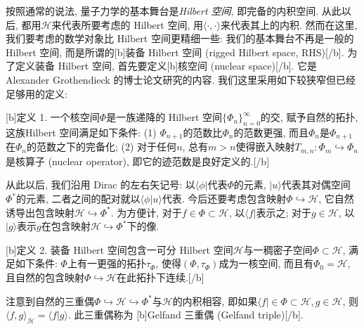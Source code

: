 
      按照通常的说法, 量子力学的基本舞台是\emph{Hilbert 空间}, 即完备的内积空间. 从此以后, 都用$\mathcal{H}$来代表所要考虑的 Hilbert 空间, 用$\langle\cdot,\cdot\rangle$来代表其上的内积. 然而在这里, 我们要考虑的数学对象比 Hilbert 空间更精细一些: 我们的基本舞台不再是一般的 Hilbert 空间, 而是所谓的[b]装备 Hilbert 空间 (rigged Hilbert space, RHS)[/b]. 为了定义装备 Hilbert 空间, 首先要定义[b]核空间 (nuclear space)[/b]. 它是 Alexander Grothendieck 的博士论文研究的内容. 我们这里采用如下较狭窄但已经足够用的定义:

      [b]定义 1. 一个核空间$\Phi$是一族递降的 Hilbert 空间$\{\Phi_n\}_{n=0}^\infty$的交, 赋予自然的拓扑, 这族Hilbert 空间满足如下条件: (1) $\Phi_{n+1}$的范数比$\Phi_n$的范数更强, 而且$\Phi_n$是$\Phi_{n+1}$在$\Phi_n$的范数之下的完备化; (2) 对于任何$n$, 总有$m>n$使得嵌入映射$T_{m,n}:\Phi_{m}\hookrightarrow\Phi_n$是核算子 (nuclear operator), 即它的迹范数是良好定义的.[/b] 

      从此以后, 我们沿用 Dirac 的左右矢记号: 以$\langle\phi|$代表$\Phi$的元素, $|u\rangle$代表其对偶空间$\Phi^*$的元素, 二者之间的配对就以$\langle\phi|u\rangle$代表. 今后还要考虑包含映射$\Phi\hookrightarrow\mathcal{H}$, 它自然诱导出包含映射$\mathcal{H}\hookrightarrow\Phi^*$. 为方便计, 对于$f\in\Phi\subset\mathcal{H}$, 以$\langle f|$表示之; 对于$g\in\mathcal{H}$, 以$|g\rangle$表示$g$在包含映射$\mathcal{H}\hookrightarrow\Phi^*$下的像.

      [b]定义 2. 装备 Hilbert 空间包含一可分 Hilbert 空间$\mathcal{H}$与一稠密子空间$\Phi\subset\mathcal{H}$, 满足如下条件: $\Phi$上有一更强的拓扑$\tau_\Phi$, 使得$(\Phi,\tau_\Phi)$成为一核空间, 而且有$\Phi_0=\mathcal{H}$, 且自然的包含映射$\Phi\hookrightarrow\mathcal{H}$在此拓扑下连续.[/b] 

      注意到自然的三重偶$\Phi\hookrightarrow\mathcal{H}\hookrightarrow\Phi^*$与$\mathcal{H}$的内积相容, 即如果$\langle f|\in\Phi\subset\mathcal{H},g\in\mathcal{H}$, 则$\langle f,g\rangle_{\mathcal{H}}=\langle f|g\rangle$. 此三重偶称为 [b]Gelfand 三重偶 (Gelfand triple)[/b].

